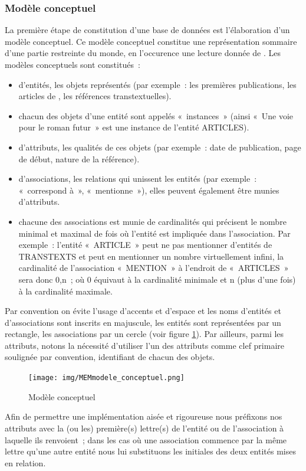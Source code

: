 \documentclass[12pt, a4paper]{article}
\begin{document}
  


\subsubsection{Modèle conceptuel}
\label{ref:db_modele_conceptuel}
 La première étape de constitution d'une base de données est l'élaboration d'un modèle conceptuel. Ce modèle conceptuel constitue une représentation sommaire d'une partie restreinte du monde, en l'occurence une lecture donnée de \punr%
 . Les modèles conceptuels sont constitués~: 
    \begin{itemize}
        \item d'entités, les objets représentés (par exemple~: les premières publications, les articles de \punr{}, les références transtextuelles).
        \item chacun des objets d'une entité sont appelés «~instances~» (ainsi «~Une voie pour le roman futur~» est une instance de l'entité ARTICLES).
        \item d'attributs, les qualités de ces objets (par exemple~: date de publication, page de début, nature de la référence).
        \item d'associations, les relations qui unissent les entités (par exemple~: «~correspond à~», «~mentionne~»), elles peuvent également être munies d'attributs.
        \item chacune des associations est munie de cardinalités qui précisent le nombre minimal et maximal de fois où l’entité est impliquée dans l’association. Par exemple~: l'entité «~ARTICLE~» peut ne pas mentionner d'entités de TRANSTEXTS et peut en mentionner un nombre virtuellement infini, la cardinalité de l'association «~MENTION~» à l'endroit de «~ARTICLES~» sera donc 0,n~; où 0 équivaut à la cardinalité minimale et n (plus d'une fois) à la cardinalité maximale.
    \end{itemize}
    Par convention on évite l'usage d'accents et d'espace et les noms d'entités et d'associations sont inscrits en majuscule, les entités sont représentées par un rectangle, les associations par un cercle (voir figure \ref{concept}). Par ailleurs, parmi les attributs, notons la nécessité d'utiliser l'un des attributs comme clef primaire soulignée par convention, identifiant de chacun des objets.


\begin{figure}[H]
    \centering
    \texttt{[image: img/MEMmodele\_conceptuel.png]}
    \caption{Modèle conceptuel}
    \label{concept}
\end{figure}
Afin de permettre une implémentation aisée et rigoureuse nous préfixons nos attributs avec la (ou les) première(s) lettre(s) de l'entité ou de l'association à laquelle ils renvoient~; dans les cas où une association commence par la même lettre qu'une autre entité nous lui substituons les initiales des deux entités mises en relation.
\end{document}

